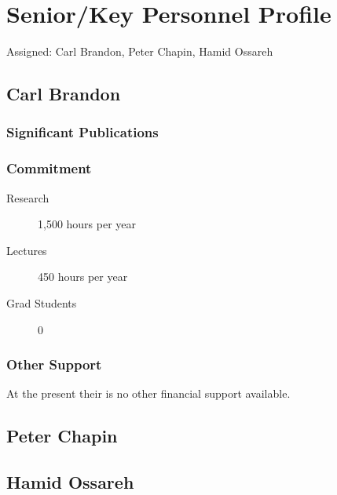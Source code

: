 \section{Senior/Key Personnel Profile}
Assigned: Carl Brandon, Peter Chapin, Hamid Ossareh
\subsection{Carl Brandon}

\subsubsection{Significant Publications}

\subsubsection{Commitment}
\begin{description}
\item[Research] 1,500 hours per year
\item[Lectures]   450 hours per year
\item[Grad Students] 0
\end{description}

\subsubsection{Other Support}
At the present their is no other financial support available.

\subsection{Peter Chapin}
%

\subsection{Hamid Ossareh}
%

